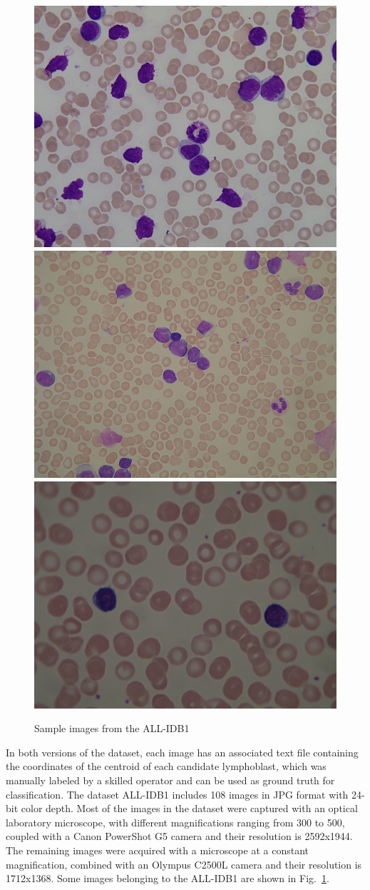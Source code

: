 \begin{figure}[!htbp]
	\centering
	\includegraphics[height=0.25\textwidth]{images/Fig17-1}
	\includegraphics[height=0.25\textwidth]{images/Fig17-2}
	\includegraphics[height=0.25\textwidth]{images/Fig17-3}
	\caption[ALL-IDB1 samples.]{\label{fig:dataset}Sample images from the ALL-IDB1}
\end{figure}

In both versions of the dataset, each image has an associated text file containing the coordinates of the centroid of each candidate lymphoblast, which was manually labeled by a skilled operator and can be used as ground truth for classification. The dataset ALL-IDB1 includes 108 images in JPG format with 24-bit color depth. Most of the images in the dataset were captured with an optical laboratory microscope, with different magnifications ranging from 300 to 500, coupled with a Canon PowerShot G5 camera and their resolution is 2592x1944. The remaining images were acquired with a microscope at a constant magnification, combined with an Olympus C2500L camera and their resolution is 1712x1368. Some images belonging to the ALL-IDB1 are shown in Fig.~\ref{fig:dataset}.

